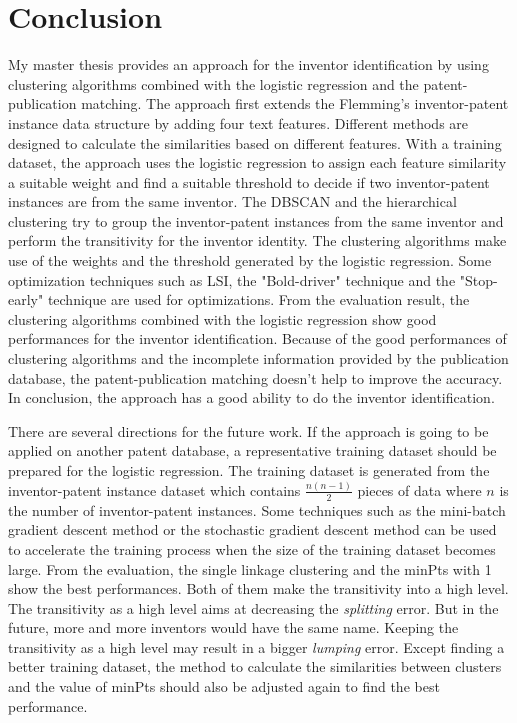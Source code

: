 \chapter{Conclusion}
\label{cha:concl}

My master thesis provides an approach for the inventor identification by using clustering algorithms combined with the logistic regression and the patent-publication matching. The approach first extends the Flemming's inventor-patent instance data structure by adding four text features. Different methods are designed to calculate the similarities based on different features. With a training dataset, the approach uses the logistic regression to assign each feature similarity a suitable weight and find a suitable threshold to decide if two inventor-patent instances are from the same inventor. The DBSCAN and the hierarchical clustering try to group the inventor-patent instances from the same inventor and perform the transitivity for the inventor identity. The clustering algorithms make use of the weights and the threshold generated by the logistic regression. Some optimization techniques such as LSI, the "Bold-driver" technique and the "Stop-early" technique are used for optimizations. From the evaluation result, the clustering algorithms combined with the logistic regression show good performances for the inventor identification. Because of the good performances of clustering algorithms and the incomplete information provided by the publication database, the patent-publication matching doesn't help to improve the accuracy. In conclusion, the approach has a good ability to do the inventor identification.
\newline

There are several directions for the future work. If the approach is going to be applied on another patent database, a representative training dataset should be prepared for the logistic regression. The training dataset is generated from the inventor-patent instance dataset which contains $\frac{n(n-1)}{2}$ pieces of data where $n$ is the number of inventor-patent instances. Some techniques such as the mini-batch gradient descent method or the stochastic gradient descent method can be used to accelerate the training process when the size of the training dataset becomes large. From the evaluation, the single linkage clustering and the minPts with 1 show the best performances. Both of them make the transitivity into a high level. The transitivity as a high level aims at decreasing the \emph{splitting} error. But in the future, more and more inventors would have the same name. Keeping the transitivity as a high level may result in a bigger \emph{lumping} error. Except finding a better training dataset, the method to calculate the similarities between clusters and the value of minPts should also be adjusted again to find the best performance. %


